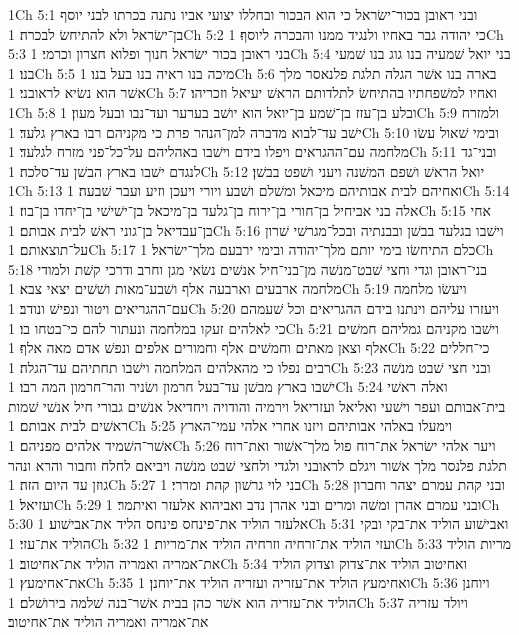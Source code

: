 1Ch 5:1  ובני ראובן בכור־ישׂראל כי הוא הבכור ובחללו יצועי אביו נתנה בכרתו לבני יוסף בן־ישׂראל ולא להתיחשׂ לבכרה׃
1Ch 5:2  כי יהודה גבר באחיו ולנגיד ממנו והבכרה ליוסף׃
1Ch 5:3  בני ראובן בכור ישׂראל חנוך ופלוא חצרון וכרמי׃
1Ch 5:4  בני יואל שׁמעיה בנו גוג בנו שׁמעי בנו׃
1Ch 5:5  מיכה בנו ראיה בנו בעל בנו׃
1Ch 5:6  בארה בנו אשׁר הגלה תלגת פלנאסר מלך אשׁר הוא נשׂיא לראובני׃
1Ch 5:7  ואחיו למשׁפחתיו בהתיחשׂ לתלדותם הראשׁ יעיאל וזכריהו׃
1Ch 5:8  ובלע בן־עזז בן־שׁמע בן־יואל הוא יושׁב בערער ועד־נבו ובעל מעון׃
1Ch 5:9  ולמזרח ישׁב עד־לבוא מדברה למן־הנהר פרת כי מקניהם רבו בארץ גלעד׃
1Ch 5:10  ובימי שׁאול עשׂו מלחמה עם־ההגראים ויפלו בידם וישׁבו באהליהם על־כל־פני מזרח לגלעד׃
1Ch 5:11  ובני־גד לנגדם ישׁבו בארץ הבשׁן עד־סלכה׃
1Ch 5:12  יואל הראשׁ ושׁפם המשׁנה ויעני ושׁפט בבשׁן׃
1Ch 5:13  ואחיהם לבית אבותיהם מיכאל ומשׁלם ושׁבע ויורי ויעכן וזיע ועבר שׁבעה׃
1Ch 5:14  אלה בני אביחיל בן־חורי בן־ירוח בן־גלעד בן־מיכאל בן־ישׁישׁי בן־יחדו בן־בוז׃
1Ch 5:15  אחי בן־עבדיאל בן־גוני ראשׁ לבית אבותם׃
1Ch 5:16  וישׁבו בגלעד בבשׁן ובבנתיה ובכל־מגרשׁי שׁרון על־תוצאותם׃
1Ch 5:17  כלם התיחשׂו בימי יותם מלך־יהודה ובימי ירבעם מלך־ישׂראל׃
1Ch 5:18  בני־ראובן וגדי וחצי שׁבט־מנשׁה מן־בני־חיל אנשׁים נשׂאי מגן וחרב ודרכי קשׁת ולמודי מלחמה ארבעים וארבעה אלף ושׁבע־מאות ושׁשׁים יצאי צבא׃
1Ch 5:19  ויעשׂו מלחמה עם־ההגריאים ויטור ונפישׁ ונודב׃
1Ch 5:20  ויעזרו עליהם וינתנו בידם ההגריאים וכל שׁעמהם כי לאלהים זעקו במלחמה ונעתור להם כי־בטחו בו׃
1Ch 5:21  וישׁבו מקניהם גמליהם חמשׁים אלף וצאן מאתים וחמשׁים אלף וחמורים אלפים ונפשׁ אדם מאה אלף׃
1Ch 5:22  כי־חללים רבים נפלו כי מהאלהים המלחמה וישׁבו תחתיהם עד־הגלה׃
1Ch 5:23  ובני חצי שׁבט מנשׁה ישׁבו בארץ מבשׁן עד־בעל חרמון ושׂניר והר־חרמון המה רבו׃
1Ch 5:24  ואלה ראשׁי בית־אבותם ועפר וישׁעי ואליאל ועזריאל וירמיה והודויה ויחדיאל אנשׁים גבורי חיל אנשׁי שׁמות ראשׁים לבית אבותם׃
1Ch 5:25  וימעלו באלהי אבותיהם ויזנו אחרי אלהי עמי־הארץ אשׁר־השׁמיד אלהים מפניהם׃
1Ch 5:26  ויער אלהי ישׂראל את־רוח פול מלך־אשׁור ואת־רוח תלגת פלנסר מלך אשׁור ויגלם לראובני ולגדי ולחצי שׁבט מנשׁה ויביאם לחלח וחבור והרא ונהר גוזן עד היום הזה׃
1Ch 5:27  בני לוי גרשׁון קהת ומררי׃
1Ch 5:28  ובני קהת עמרם יצהר וחברון ועזיאל׃
1Ch 5:29  ובני עמרם אהרן ומשׁה ומרים ובני אהרן נדב ואביהוא אלעזר ואיתמר׃
1Ch 5:30  אלעזר הוליד את־פינחס פינחס הליד את־אבישׁוע׃
1Ch 5:31  ואבישׁוע הוליד את־בקי ובקי הוליד את־עזי׃
1Ch 5:32  ועזי הוליד את־זרחיה וזרחיה הוליד את־מריות׃
1Ch 5:33  מריות הוליד את־אמריה ואמריה הוליד את־אחיטוב׃
1Ch 5:34  ואחיטוב הוליד את־צדוק וצדוק הוליד את־אחימעץ׃
1Ch 5:35  ואחימעץ הוליד את־עזריה ועזריה הוליד את־יוחנן׃
1Ch 5:36  ויוחנן הוליד את־עזריה הוא אשׁר כהן בבית אשׁר־בנה שׁלמה בירושׁלם׃
1Ch 5:37  ויולד עזריה את־אמריה ואמריה הוליד את־אחיטוב׃

